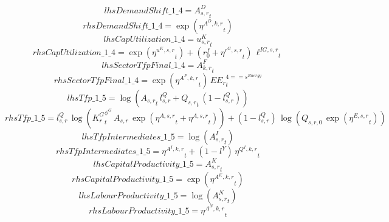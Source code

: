 \begin{dmath*}
lhsDemandShift\_1\_4 = {{A^{D}_{s,r}}}_{t}
\end{dmath*}
\begin{dmath*}
rhsDemandShift\_1\_4 = \exp\left({{\eta^{A^{D},k,r}}}_{t}\right)
\end{dmath*}
\begin{dmath*}
lhsCapUtilization\_1\_4 = {{u^K_{s,r}}}_{t}
\end{dmath*}
\begin{dmath*}
rhsCapUtilization\_1\_4 = \exp\left({{\eta^{u^K,s,r}}}_{t}\right)+\left({{r^f_0}}+{{\eta^{r^G,s,r}}}_{t}\right)\, {{\ell^{IG,s,r}}}_{t}
\end{dmath*}
\begin{dmath*}
lhsSectorTfpFinal\_1\_4 = {{A^{F}_{k,r}}}_{t}
\end{dmath*}
\begin{dmath*}
rhsSectorTfpFinal\_1\_4 = \exp\left({{\eta^{A^F,k,r}}}_{t}\right)\, {{EE_r}}_{t}^{4=={{s^{Energy}}}}
\end{dmath*}
\begin{dmath*}
lhsTfp\_1\_5 = \log\left({{A_{s,r}}}_{t}\, {{l^{Q}_{s,r}}}+{{Q_{s,r}}}_{t}\, \left(1-{{l^{Q}_{s,r}}}\right)\right)
\end{dmath*}
\begin{dmath*}
rhsTfp\_1\_5 = {{l^{Q}_{s,r}}}\, \log\left({{K^G_{r}}}_{t}^{{{\phi^{G}}}}\, {{A_{s,r}}}\, \exp\left({{\eta^{A,s,r}}}_{t}+{{\eta^{A,s,r}}}_{t}\right)\right)+\left(1-{{l^{Q}_{s,r}}}\right)\, \log\left({{Q_{s,r,0}}}\, \exp\left({{\eta^{E,s,r}}}_{t}\right)\right)
\end{dmath*}
\begin{dmath*}
lhsTfpIntermediates\_1\_5 = \log\left({{A^{I}_{s,r}}}_{t}\right)
\end{dmath*}
\begin{dmath*}
rhsTfpIntermediates\_1\_5 = {{\eta^{A^{I},k,r}}}_{t}+\left(1-{{l^{Y}}}\right)\, {{\eta^{Q^{I},k,r}}}_{t}
\end{dmath*}
\begin{dmath*}
lhsCapitalProductivity\_1\_5 = {{A^{K}_{s,r}}}_{t}
\end{dmath*}
\begin{dmath*}
rhsCapitalProductivity\_1\_5 = \exp\left({{\eta^{A^{K},k,r}}}_{t}\right)
\end{dmath*}
\begin{dmath*}
lhsLabourProductivity\_1\_5 = \log\left({{A^{N}_{s,r}}}_{t}\right)
\end{dmath*}
\begin{dmath*}
rhsLabourProductivity\_1\_5 = {{\eta^{A^{N},k,r}}}_{t}
\end{dmath*}

